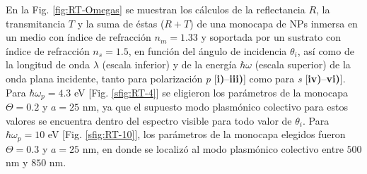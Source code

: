 
En la Fig. \ref{fig:RT-Omegas} se muestran los cálculos de la reflectancia $R$, la transmitancia $T$ y la suma de éstas ($R+T$) de una monocapa de NPs inmersa en un medio con índice de refracción $n_m=1.33$ y soportada por un sustrato con índice de refracción $n_s=1.5$, en función del ángulo de incidencia $\theta_i$, así como de la longitud de onda $\lambda$ (escala inferior) y de la energía  $\hbar\omega$ (escala superior) de la onda plana incidente, tanto para polarización \emph{p}  [\textbf{i)}--\textbf{iii)}] como para \emph{s} [\textbf{iv)}--\textbf{vi)}]. Para $\hbar\omega_p=4.3$ eV [Fig. \ref{sfig:RT-4}] se eligieron los parámetros de la monocapa $\Theta=0.2$ y $a=25$ nm, ya que el supuesto modo plasmónico colectivo para estos valores se encuentra dentro del espectro visible para todo valor de $\theta_i$. Para $\hbar\omega_p=10$ eV [Fig. \ref{sfig:RT-10}], los parámetros de la monocapa elegidos fueron $\Theta=0.3$ y $a=25$ nm, en donde se localizó al modo plasmónico colectivo entre $500$ nm y $850$ nm.

